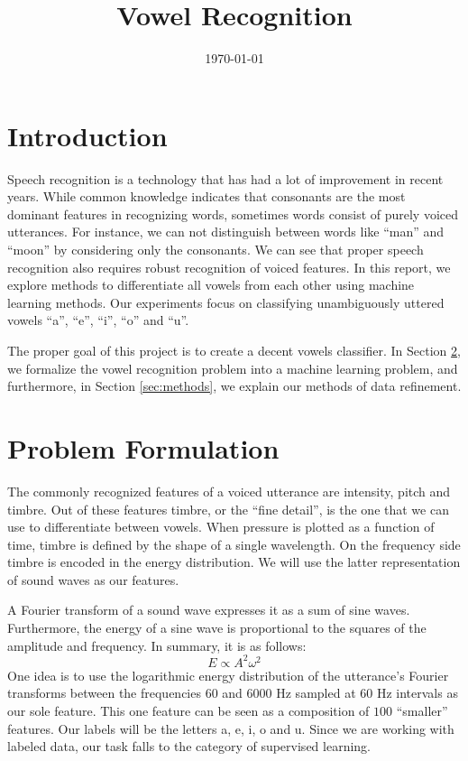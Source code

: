 \documentclass[letterpaper,12pt]{article}
\begin{document}
\title{Vowel Recognition}
\author{}
\date{\AdvanceDate[-1]\today}
\maketitle

\section{Introduction}

Speech recognition is a technology that has had a lot of improvement in recent years. While common knowledge indicates that consonants are the most dominant features in recognizing words, sometimes words consist of purely voiced utterances. For instance, we can not distinguish between words like ``man'' and ``moon'' by considering only the consonants. We can see that proper speech recognition also requires robust recognition of voiced features. In this report, we explore methods to differentiate all vowels from each other using machine learning methods. Our experiments focus on classifying unambiguously uttered vowels ``a'', ``e'', ``i'', ``o'' and ``u''.

The proper goal of this project is to create a decent vowels classifier. In Section \ref{sec:problem-formulation}, we formalize the vowel recognition problem into a machine learning problem, and furthermore, in Section \ref{sec:methods}, we explain our methods of data refinement. 


\section{Problem Formulation}\label{sec:problem-formulation}

The commonly recognized features of a voiced utterance are intensity, pitch and timbre. Out of these features timbre, or the ``fine detail'', is the one that we can use to differentiate between vowels. When pressure is plotted as a function of time, timbre is defined by the shape of a single wavelength. On the frequency side timbre is encoded in the energy distribution. We will use the latter representation of sound waves as our features.

A Fourier transform of a sound wave expresses it as a sum of sine waves. Furthermore, the energy of a sine wave is proportional to the squares of the amplitude and frequency. In summary, it is as follows: 
\begin{equation}
E\propto A^2\omega^2
\end{equation}
One idea is to use the logarithmic energy distribution of the utterance's Fourier transforms between the frequencies $60$ and $6000$ Hz sampled at $60$ Hz intervals as our sole feature. This one feature can be seen as a composition of $100$ ``smaller'' features. Our labels will be the letters a, e, i, o and u. Since we are working with labeled data, our task falls to the category of supervised learning.
\end{document}
